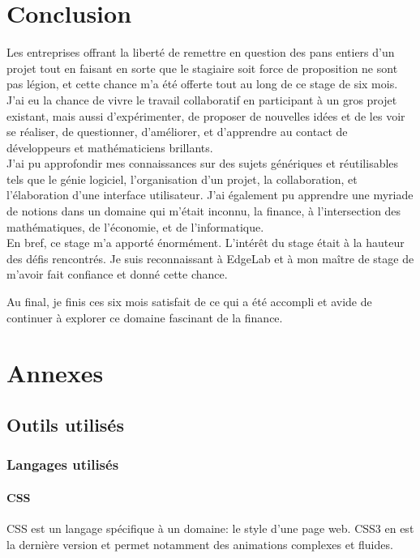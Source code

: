 \documentclass[a4paper,french,12pt]{article}
\begin{document}
\section{Conclusion}
	Les entreprises offrant la liberté de remettre en question des pans entiers d'un projet tout en faisant en sorte que le stagiaire soit force de proposition ne sont pas légion, et cette chance m'a été offerte tout au long de ce stage de six mois.
J'ai eu la chance de vivre le travail collaboratif en participant à un gros projet existant, mais aussi d'expérimenter, de proposer de nouvelles idées et de les voir se réaliser, de questionner, d'améliorer, et d'apprendre au contact de développeurs et mathématiciens brillants.~\\

	J'ai pu approfondir mes connaissances sur des sujets génériques et réutilisables tels que le génie logiciel, l'organisation d'un projet, la collaboration, et l'élaboration d'une interface utilisateur. J'ai également pu apprendre une myriade de notions dans un domaine qui m'était inconnu, la finance, à l'intersection des mathématiques, de l'économie, et de l'informatique.~\\
	
	En bref, ce stage m'a apporté énormément. L'intérêt du stage était à la hauteur des défis rencontrés.
	Je suis reconnaissant à EdgeLab et à mon maître de stage de m'avoir fait confiance et donné cette chance.

	Au final, je finis ces six mois satisfait de ce qui a été accompli et avide de continuer à explorer ce domaine fascinant de la finance.
	\newpage
\section{Annexes}

	\subsection{Outils utilisés}

		\subsubsection{Langages utilisés}
		
			\paragraph{CSS}
			CSS est un langage spécifique à un domaine: le style d'une page web. CSS3 en est la dernière version et permet notamment des animations complexes et fluides.
			
\end{document}
